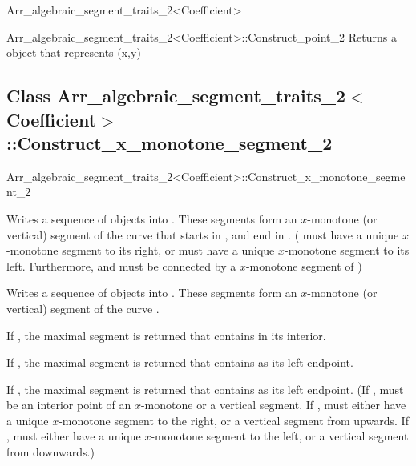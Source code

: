\begin{ccRefClass}{Arr_algebraic_segment_traits_2<Coefficient>}
\begin{ccClass}{Arr_algebraic_segment_traits_2<Coefficient>::Construct_point_2}
        {Returns a  object that represents (x,y)} 

\end{ccClass}

\subsection*{Class 
Arr\_algebraic\_segment\_traits\_2$<$Coefficient$>$::Construct\_x\_monotone\_segment\_2}

\begin{ccClass}{Arr_algebraic_segment_traits_2<Coefficient>::Construct_x_monotone_segment_2}


        {Writes a sequence of  objects into .
         These segments form an $x$-monotone (or vertical) 
         segment of the curve  
         that starts in , and end in .
         \ccPrecond( must have a unique $x$-monotone segment
                    to its right, or  must have a unique
                    $x$-monotone segment to its left. Furthermore, 
                     and  must be connected
                    by a $x$-monotone segment of )}

        {Writes a sequence of  objects into .
         These segments form an $x$-monotone (or vertical) 
         segment of the curve .

         If , the maximal segment is
         returned that contains  in its interior.

         If , the maximal segment is
         returned that contains  as its left endpoint.

         If , the maximal segment is
         returned that contains  as its left endpoint.
         \ccPrecond(If , 
                    must be an interior point of an $x$-monotone or a vertical
                    segment.
                    If , 
                    must either have a unique $x$-monotone segment to the right,
                    or a vertical segment from  upwards.
                    If , 
                    must either have a unique $x$-monotone segment to the left,
                    or a vertical segment from  downwards.)}


\end{ccClass}
\end{ccRefClass}
